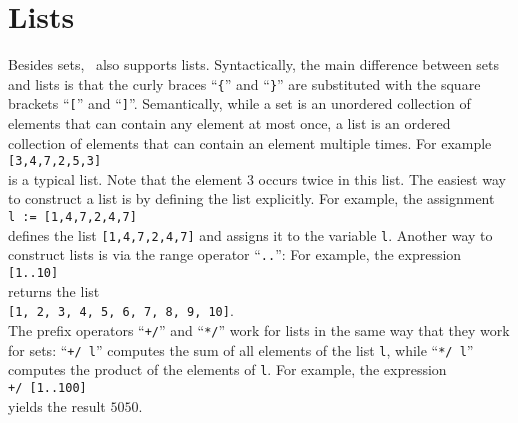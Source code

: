 \section{Lists}
Besides sets, \setlx\ also supports lists.  Syntactically, the main difference between sets and
lists is that the
curly braces ``\texttt{\{}'' and ``\texttt{\}}'' are substituted with the square brackets
``\texttt{[}'' and ``\texttt{]}''.  Semantically, while a set is an unordered collection of elements
that can contain any element at most once, a list is an ordered collection of elements that 
can contain an element multiple times.  For example
\\[0.2cm]
\hspace*{1.3cm}
\texttt{[3,4,7,2,5,3]}
\\[0.2cm]
is a typical list.  Note that the element $3$ occurs twice in this list.  The easiest way to
construct a list is by defining the list explicitly. For 
example, the assignment
\\[0.2cm]
\hspace*{1.3cm}
\texttt{l := [1,4,7,2,4,7]}
\\[0.2cm]
defines the list \texttt{[1,4,7,2,4,7]} and assigns it to the variable \texttt{l}.
Another way to construct lists is via the range operator ``\texttt{..}'':
For example, the expression
\\[0.2cm]
\hspace*{1.3cm}
\texttt{[1..10]}
\\[0.2cm]
returns the list
\\[0.2cm]
\hspace*{1.3cm}
\texttt{[1, 2, 3, 4, 5, 6, 7, 8, 9, 10]}.
\\[0.2cm]
The prefix operators ``\texttt{+/}'' and ``\texttt{*/}'' work for lists in the same way that they
work for sets: ``\texttt{+/ l}'' computes the sum of all elements of the list \texttt{l}, while
``\texttt{*/ l}'' computes the product of the elements of \texttt{l}.  For example, the expression
\\[0.2cm]
\hspace*{1.3cm}
\texttt{+/ [1..100]}
\\[0.2cm]
yields the result $5050$.

